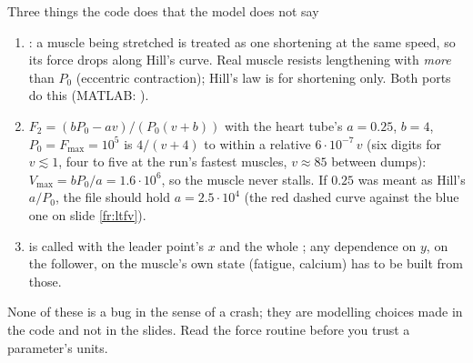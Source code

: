 \documentclass[aspectratio=169,11pt]{beamer}
\begin{document}
\begin{frame}{Three things the code does that the model does not say}
\label{fr:fvltnotes}
\small
\begin{enumerate}
  \item {} : a muscle being stretched is treated as one shortening at the same speed, so its force drops along Hill's curve. Real muscle resists lengthening with \emph{more} than $P_0$ (eccentric contraction); Hill's law is for shortening only. Both ports do this (MATLAB: ).
  \item {} $F_2 = (bP_0 - a v)/(P_0(v + b))$ with the heart tube's $a = 0.25$, $b = 4$, $P_0 = F_{\max} = 10^5$ is $4/(v + 4)$ to within a relative $6 \cdot 10^{-7}\,v$ (six digits for $v \lesssim 1$, four to five at the run's fastest muscles, $v \approx 85$ between dumps): $V_{\max} = bP_0/a = 1.6 \cdot 10^6$, so the muscle never stalls. If $0.25$ was meant as Hill's $a/P_0$, the file should hold $a = 2.5 \cdot 10^4$ (the red dashed curve against the blue one on slide \ref{fr:ltfv}).
  \item {}  is called with the leader point's $x$ and the whole ; any dependence on $y$, on the follower, on the muscle's own state (fatigue, calcium) has to be built from those.
\end{enumerate}
\begin{punchbox}
\small None of these is a bug in the sense of a crash; they are modelling choices made in the code and not in the slides. Read the force routine before you trust a parameter's units.
\end{punchbox}
\end{frame}
\end{document}
